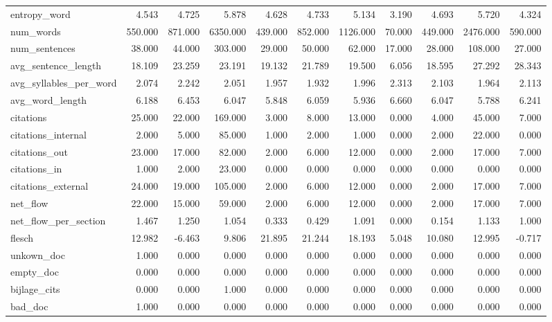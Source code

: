 \begin{tabular}{lrrrrrrrrrr}
\cline{1-11}
entropy\_word & 4.543 & 4.725 & 5.878 & 4.628 & 4.733 & 5.134 & 3.190 & 4.693 & 5.720 & 4.324 \\
\cline{1-11}
num\_words & 550.000 & 871.000 & 6350.000 & 439.000 & 852.000 & 1126.000 & 70.000 & 449.000 & 2476.000 & 590.000 \\
\cline{1-11}
num\_sentences & 38.000 & 44.000 & 303.000 & 29.000 & 50.000 & 62.000 & 17.000 & 28.000 & 108.000 & 27.000 \\
\cline{1-11}
avg\_sentence\_length & 18.109 & 23.259 & 23.191 & 19.132 & 21.789 & 19.500 & 6.056 & 18.595 & 27.292 & 28.343 \\
\cline{1-11}
avg\_syllables\_per\_word & 2.074 & 2.242 & 2.051 & 1.957 & 1.932 & 1.996 & 2.313 & 2.103 & 1.964 & 2.113 \\
\cline{1-11}
avg\_word\_length & 6.188 & 6.453 & 6.047 & 5.848 & 6.059 & 5.936 & 6.660 & 6.047 & 5.788 & 6.241 \\
\cline{1-11}
citations & 25.000 & 22.000 & 169.000 & 3.000 & 8.000 & 13.000 & 0.000 & 4.000 & 45.000 & 7.000 \\
\cline{1-11}
citations\_internal & 2.000 & 5.000 & 85.000 & 1.000 & 2.000 & 1.000 & 0.000 & 2.000 & 22.000 & 0.000 \\
\cline{1-11}
citations\_out & 23.000 & 17.000 & 82.000 & 2.000 & 6.000 & 12.000 & 0.000 & 2.000 & 17.000 & 7.000 \\
\cline{1-11}
citations\_in & 1.000 & 2.000 & 23.000 & 0.000 & 0.000 & 0.000 & 0.000 & 0.000 & 0.000 & 0.000 \\
\cline{1-11}
citations\_external & 24.000 & 19.000 & 105.000 & 2.000 & 6.000 & 12.000 & 0.000 & 2.000 & 17.000 & 7.000 \\
\cline{1-11}
net\_flow & 22.000 & 15.000 & 59.000 & 2.000 & 6.000 & 12.000 & 0.000 & 2.000 & 17.000 & 7.000 \\
\cline{1-11}
net\_flow\_per\_section & 1.467 & 1.250 & 1.054 & 0.333 & 0.429 & 1.091 & 0.000 & 0.154 & 1.133 & 1.000 \\
\cline{1-11}
flesch & 12.982 & -6.463 & 9.806 & 21.895 & 21.244 & 18.193 & 5.048 & 10.080 & 12.995 & -0.717 \\
\cline{1-11}
unkown\_doc & 1.000 & 0.000 & 0.000 & 0.000 & 0.000 & 0.000 & 0.000 & 0.000 & 0.000 & 0.000 \\
\cline{1-11}
empty\_doc & 0.000 & 0.000 & 0.000 & 0.000 & 0.000 & 0.000 & 0.000 & 0.000 & 0.000 & 0.000 \\
\cline{1-11}
bijlage\_cits & 0.000 & 0.000 & 1.000 & 0.000 & 0.000 & 0.000 & 0.000 & 0.000 & 0.000 & 0.000 \\
\cline{1-11}
bad\_doc & 1.000 & 0.000 & 0.000 & 0.000 & 0.000 & 0.000 & 0.000 & 0.000 & 0.000 & 0.000 \\
\cline{1-11}
\bottomrule
\end{tabular}
